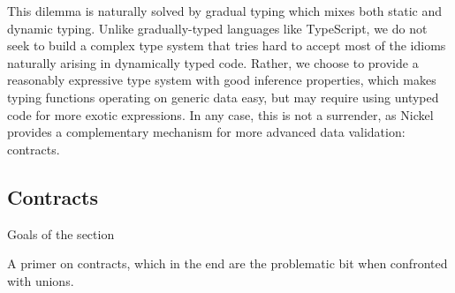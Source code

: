 \documentclass[sigplan,10pt,review,anonymous]{acmart}
\newcommand{\unsure}[2][1=]{}
\begin{document}
This dilemma is naturally solved by gradual typing\cite{Siek06gradualtyping}
which mixes both static and dynamic typing. Unlike gradually-typed languages
like TypeScript\unsure{Todo: explain that typescript uses unions as
  static typing whereas we are speaking of dynamic contracts}, we do not seek to build a complex type system that tries hard
to accept most of the idioms naturally arising in dynamically typed code.
Rather, we choose to provide a reasonably expressive type system with good
inference properties, which makes typing functions operating on generic data easy,
but may require using untyped code for more exotic expressions.  In any case,
this is not a surrender, as Nickel provides a complementary mechanism for more
advanced data validation: contracts.

\subsection{Contracts}
{\color{red}Goals of the section

A primer on contracts, which in the end are the problematic bit when confronted
with unions.\vspace{0.5cm}}
\end{document}
